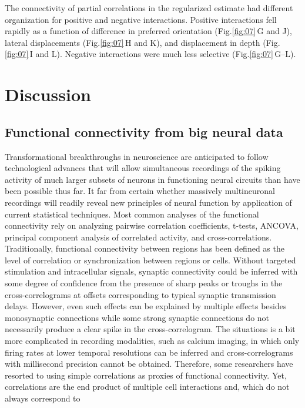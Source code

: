 \documentclass[10pt]{article}
\begin{document}
The connectivity of partial correlations in the regularized estimate had different organization for positive and negative interactions. Positive interactions fell rapidly as a function of difference in preferred orientation (Fig.\;\ref{fig:07}\,G and J), lateral displacements (Fig.\;\ref{fig:07}\,H and K), and displacement in depth (Fig.\;\ref{fig:07}\,I and L). Negative interactions were much less selective (Fig.\;\ref{fig:07}\,G--L).


\section*{Discussion}
\subsection*{Functional connectivity from big neural data}
Transformational breakthroughs in neuroscience are anticipated to follow technological advances that will allow simultaneous recordings of the spiking activity of much larger subsets of neurons in functioning neural circuits than have been possible thus far. It far from certain whether massively multineuronal recordings will readily reveal new principles of neural function by application of current statistical techniques. Most common analyses of the functional connectivity rely on analyzing pairwise correlation coefficients, t-tests, ANCOVA, principal component analysis of correlated activity, and cross-correlations.  Traditionally, functional connectivity between regions has been defined as the level of correlation or synchronization between regions or cells. Without targeted stimulation and intracellular signals, synaptic connectivity could be inferred with some degree of confidence from the presence of sharp peaks or troughs in the cross-correlograms at offsets corresponding to typical synaptic transmission delays. However, even such effects can be explained by multiple effects besides monosynaptic connections while some strong synaptic connections do not necessarily produce a clear spike in the cross-correlogram. The situations is a bit more complicated in recording modalities, such as calcium imaging, in which only firing rates at lower temporal resolutions can be inferred and cross-correlograms with millisecond precision cannot be obtained. Therefore, some researchers have resorted to using simple correlations as proxies of functional connectivity. Yet, correlations are the end product of multiple cell interactions and, which do not always correspond to 
\end{document}
